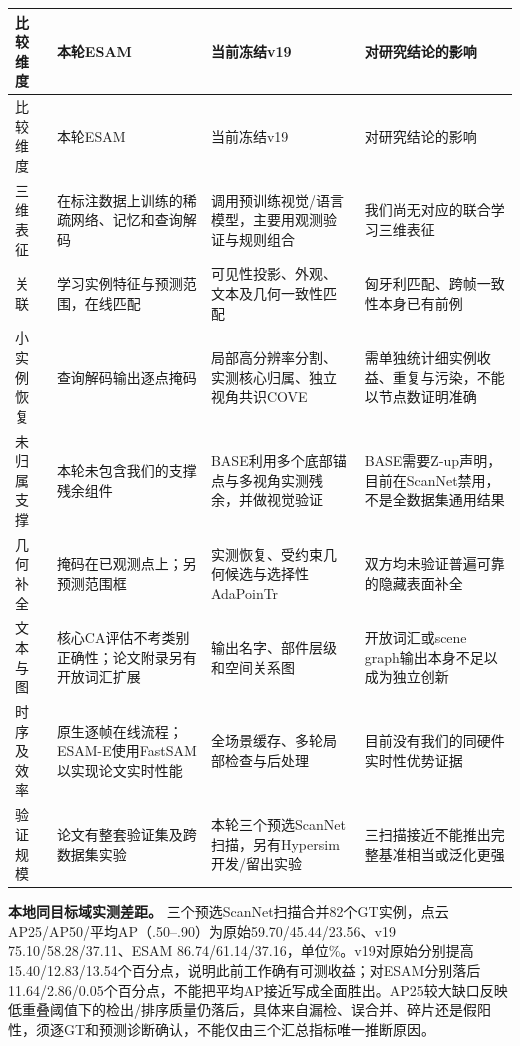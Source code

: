 \documentclass[UTF8,fontset=fandol]{ctexart}
\begin{document}
{\small
\begin{longtable}{|p{}|p{}|p{}|p{}|}
\hline
比较维度 & 本轮ESAM & 当前冻结v19 & 对研究结论的影响 \\ \hline
\endfirsthead
\hline
比较维度 & 本轮ESAM & 当前冻结v19 & 对研究结论的影响 \\ \hline
\endhead
三维表征 & 在标注数据上训练的稀疏网络、记忆和查询解码 & 调用预训练视觉/语言模型，主要用观测验证与规则组合 & 我们尚无对应的联合学习三维表征 \\ \hline
关联 & 学习实例特征与预测范围，在线匹配 & 可见性投影、外观、文本及几何一致性匹配 & 匈牙利匹配、跨帧一致性本身已有前例 \\ \hline
小实例恢复 & 查询解码输出逐点掩码 & 局部高分辨率分割、实测核心归属、独立视角共识COVE & 需单独统计细实例收益、重复与污染，不能以节点数证明准确 \\ \hline
未归属支撑 & 本轮未包含我们的支撑残余组件 & BASE利用多个底部锚点与多视角实测残余，并做视觉验证 & BASE需要Z-up声明，目前在ScanNet禁用，不是全数据集通用结果 \\ \hline
几何补全 & 掩码在已观测点上；另预测范围框 & 实测恢复、受约束几何候选与选择性AdaPoinTr & 双方均未验证普遍可靠的隐藏表面补全 \\ \hline
文本与图 & 核心CA评估不考类别正确性；论文附录另有开放词汇扩展 & 输出名字、部件层级和空间关系图 & 开放词汇或scene graph输出本身不足以成为独立创新 \\ \hline
时序及效率 & 原生逐帧在线流程；ESAM-E使用FastSAM以实现论文实时性能 & 全场景缓存、多轮局部检查与后处理 & 目前没有我们的同硬件实时性优势证据 \\ \hline
验证规模 & 论文有整套验证集及跨数据集实验 & 本轮三个预选ScanNet扫描，另有Hypersim开发/留出实验 & 三扫描接近不能推出完整基准相当或泛化更强 \\ \hline
\end{longtable}
}

\textbf{本地同目标域实测差距。} 三个预选ScanNet扫描合并82个GT实例，点云AP25/AP50/平均AP（.50–.90）为原始59.70/45.44/23.56、v19 75.10/58.28/37.11、ESAM 86.74/61.14/37.16，单位\%。v19对原始分别提高15.40/12.83/13.54个百分点，说明此前工作确有可测收益；对ESAM分别落后11.64/2.86/0.05个百分点，不能把平均AP接近写成全面胜出。AP25较大缺口反映低重叠阈值下的检出/排序质量仍落后，具体来自漏检、误合并、碎片还是假阳性，须逐GT和预测诊断确认，不能仅由三个汇总指标唯一推断原因。
\end{document}
